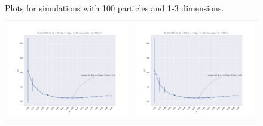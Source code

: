 \begin{figure}
\begin{tabular}{cc}
\end{tabular}
\caption{Plots for simulations with 100 particles and 1-3 dimensions.}
\label{fig:1c_100}
\end{figure}
\begin{figure}
\hspace{-2.8cm}
\begin{tabular}{cc}
\includegraphics[width = 0.5\paperwidth]{figures/c_figs/IM_NIA_np_500_nd_1.pdf} & \includegraphics[width = 0.5\paperwidth]{figures/c_figs/IM_NIA_np_500_nd_1.pdf} \\

\end{tabular}
\end{figure}
